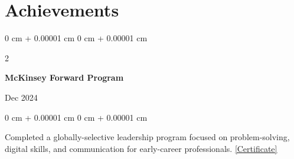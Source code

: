 \documentclass[10pt, letterpaper]{article}
\newenvironment{onecolentry}{
    \begin{adjustwidth}{
        0 cm + 0.00001 cm
    }{
        0 cm + 0.00001 cm
    }
}{
    \end{adjustwidth}
}
\newenvironment{twocolentry}[2][]{
    \onecolentry
    \def\secondColumn{#2}
    \setcolumnwidth{\fill, 4.5 cm}
    \begin{paracol}{2}
}{
    \switchcolumn \raggedleft \secondColumn
    \end{paracol}
    \endonecolentry
}
\begin{document}
    \section{Achievements}

    \begin{samepage}
        \begin{twocolentry}{
            Dec 2024
        }
            \textbf{McKinsey Forward Program}
        \end{twocolentry}

        \vspace{0.10 cm}
        \begin{onecolentry}
            Completed a globally-selective leadership program focused on problem-solving, digital skills, and communication for early-career professionals. \href{https://www.credly.com/badges/13e23e31-1b12-41ff-90d8-7f8193dae3aa/linked_in_profile}{\underline{[Certificate]}}
        \end{onecolentry}
    \end{samepage}
\end{document}
